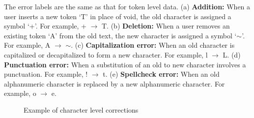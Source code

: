 \documentclass[10pt, conference, compsocconf]{IEEEtran}
\begin{document}
\begin{enumerate}
The error labels are the same as that for token level data.
(a) \textbf{Addition: } When a user inserts a new token `T' in place of void, the old character is assigned a symbol `+'. For example, + $\rightarrow$ T.
(b) \textbf{Deletion: } When a user removes an existing token `A' from the old text, the new character is assigned a symbol `$\sim$'. For example, A $\rightarrow$ $\sim$.
(c) \textbf{Capitalization error: } When an old character is capitalized or decapitalized to form a new character. For example, l $\rightarrow$ L.
(d) \textbf{Punctuation error: } When a substitution of an old to new character involves a punctuation. For example, ! $\rightarrow$ t.
(e) \textbf{Spellcheck error: } When an old alphanumeric character is replaced by a new alphanumeric character. For example, o $\rightarrow$ e.

\begin{figure}[ht]
\begin{center}
\caption{Example of character level corrections}
\label{News_01}
\end{center}
\end{figure}



\end{enumerate}
\end{document}
